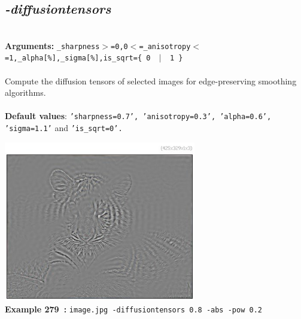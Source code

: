 \documentclass[a4paper,11pt,twoside]{book}
\begin{document}
\subsection{\emph{-diffusiontensors} }\vspace*{-0.5em}
~\\\textbf{Arguments: } 
{\small \texttt{\_sharpness$>$=0,0$<$=\_anisotropy$<$=1,\_alpha[\%],\_sigma[\%],is\_sqrt=\{ 0 ~$|$~ 1 \}}}\\~\\
Compute the diffusion tensors of selected images for edge-preserving smoothing algorithms.
~\\~\\\textbf{Default values}: {\small \texttt{'sharpness=0.7', 'anisotropy=0.3', 'alpha=0.6', 'sigma=1.1'} and \texttt{'is\_sqrt=0'.}}
\begin{center}\includegraphics[keepaspectratio=true,height=7cm,width=\textwidth]{img/gmic_def279.jpg}\\
{\footnotesize \textbf{Example 279~:} \texttt{image.jpg -diffusiontensors 0.8 -abs -pow 0.2}}
\end{center}
\end{document}
